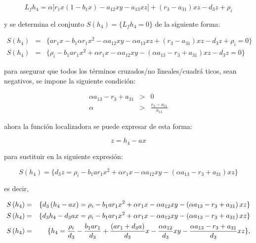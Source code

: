 \documentclass[letterpaper,11pt]{article}
\begin{document}
\begin{equation*}
L_{f}h_{4}=\alpha \lbrack r_{1}x\left( 1-b_{1}x\right)
-a_{12}xy-a_{13}xz]+(r_{3}-a_{31})xz-d_{3}z+\rho _{i}
\end{equation*}

y se determina el conjunto $S\left( h_{4}\right) =\{L_{f}h_{4}=0\}$ de la
siguiente forma:

\begin{eqnarray*}
S\left( h_{4}\right) &=&\{ar_{1}x-b_{1}\alpha r_{1}x^{2}-\alpha
a_{12}xy-\alpha a_{13}xz+\left( r_{3}-a_{31}\right) xz-d_{3}z+\rho _{i}=0\}
\\
S\left( h_{4}\right) &=&\{\rho _{i}-b_{1}ar_{1}x^{2}+\alpha r_{1}x-\alpha
a_{12}xy-\left( \alpha a_{13}-r_{3}+a_{31}\right) xz-d_{3}z=0\}
\end{eqnarray*}

para asegurar que todos los t\'{e}rminos cruzados/no l\'{\i}neales/cuadr\'{a}%
ticos, sean negativos, se impone la siguiente condici\'{o}n:

\begin{eqnarray*}
\alpha a_{13}-r_{3}+a_{31} &>&0 \\
\alpha &>&\frac{r_{3}-a_{31}}{a_{13}}
\end{eqnarray*}

ahora la funci\'{o}n localizadora se puede expresar de esta forma:

\begin{equation*}
z=h_{4}-ax
\end{equation*}

para sustituir en la siguiente expresi\'{o}n:

\begin{equation*}
S\left( h_{4}\right) =\{d_{3}z=\rho _{i}-b_{1}ar_{1}x^{2}+\alpha
r_{1}x-\alpha a_{12}xy-\left( \alpha a_{13}-r_{3}+a_{31}\right) xz\}
\end{equation*}

es decir,

\begin{eqnarray*}
S\left( h_{4}\right) &=&\{d_{3}\left( h_{4}-ax\right) =\rho
_{i}-b_{1}ar_{1}x^{2}+\alpha r_{1}x-\alpha a_{12}xy-\left( \alpha
a_{13}-r_{3}+a_{31}\right) xz\} \\
S\left( h_{4}\right) &=&\{d_{3}h_{4}-d_{3}ax=\rho
_{i}-b_{1}ar_{1}x^{2}+\alpha r_{1}x-\alpha a_{12}xy-\left( \alpha
a_{13}-r_{3}+a_{31}\right) xz\} \\
S\left( h_{4}\right) &=&\{h_{4}=\frac{\rho _{i}}{d_{3}}-\frac{b_{1}ar_{1}}{%
d_{3}}+\frac{\left( ar_{1}+d_{3}a\right) }{d_{3}}x-\frac{\alpha a_{12}}{d_{3}%
}xy-\frac{\alpha a_{13}-r_{3}+a_{31}}{d_{3}}xz\},
\end{eqnarray*}
\end{document}
